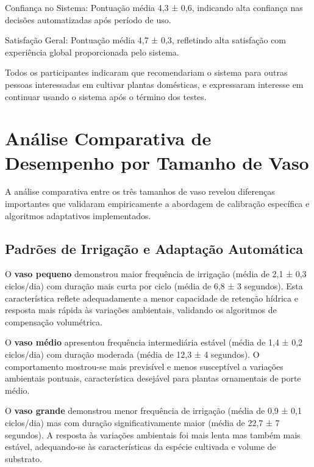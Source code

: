 \documentclass[twoside,english,brazilian]{UNISINOSmonografia}
\begin{document}
Confiança no Sistema: Pontuação média 4,3 ± 0,6, indicando alta confiança nas decisões automatizadas após período de uso.

Satisfação Geral: Pontuação média 4,7 ± 0,3, refletindo alta satisfação com experiência global proporcionada pelo sistema.

Todos os participantes indicaram que recomendariam o sistema para outras pessoas interessadas em cultivar plantas domésticas, e expressaram interesse em continuar usando o sistema após o término dos testes.

\section{Análise Comparativa de Desempenho por Tamanho de Vaso}

A análise comparativa entre os três tamanhos de vaso revelou diferenças importantes que validaram empiricamente a abordagem de calibração específica e algoritmos adaptativos implementados.

\subsection{Padrões de Irrigação e Adaptação Automática}

O \textbf{vaso pequeno} demonstrou maior frequência de irrigação (média de 2,1 ± 0,3 ciclos/dia) com duração mais curta por ciclo (média de 6,8 ± 3 segundos). Esta característica reflete adequadamente a menor capacidade de retenção hídrica e resposta mais rápida às variações ambientais, validando os algoritmos de compensação volumétrica.

O \textbf{vaso médio} apresentou frequência intermediária estável (média de 1,4 ± 0,2 ciclos/dia) com duração moderada (média de 12,3 ± 4 segundos). O comportamento mostrou-se mais previsível e menos susceptível a variações ambientais pontuais, característica desejável para plantas ornamentais de porte médio.

O \textbf{vaso grande} demonstrou menor frequência de irrigação (média de 0,9 ± 0,1 ciclos/dia) mas com duração significativamente maior (média de 22,7 ± 7 segundos). A resposta às variações ambientais foi mais lenta mas também mais estável, adequando-se às características da espécie cultivada e volume de substrato.
\end{document}

